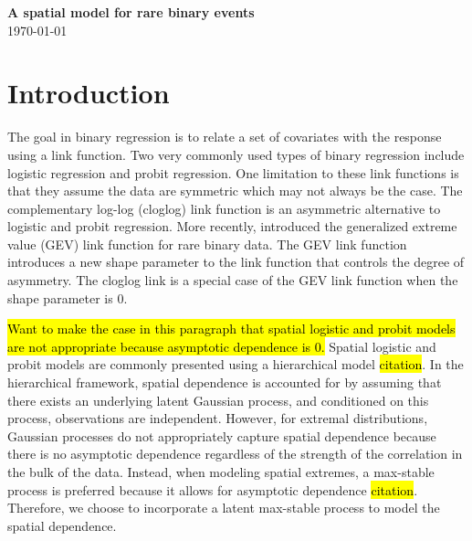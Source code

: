 \documentclass[11pt]{article}
\begin{document}
\linenumbers

\begin{center}
{\Large {\bf A spatial model for rare binary events}}\\
\today
\end{center}

\section{Introduction}\label{s:intro}
The goal in binary regression is to relate a set of covariates with the response using a link function.
Two very commonly used types of binary regression include logistic regression
and probit regression.
One limitation to these link functions is that they assume the data are symmetric which may not always be the case.
The complementary log-log (cloglog) link function is an asymmetric alternative to logistic and probit regression.
More recently, \citet{Wang2010} introduced the generalized extreme value (GEV) link function for rare binary data.
The GEV link function introduces a new shape parameter to the link function that controls the degree of asymmetry.
The cloglog link is a special case of the GEV link function when the shape parameter is 0.


\hl{Want to make the case in this paragraph that spatial logistic and probit models are not appropriate because asymptotic dependence is 0.}
Spatial logistic and probit models are commonly presented using a hierarchical model \hl{citation}.
In the hierarchical framework, spatial dependence is accounted for by assuming that there exists an underlying latent Gaussian process, and conditioned on this process, observations are independent.
However, for extremal distributions, Gaussian processes do not appropriately capture spatial dependence because there is no asymptotic dependence regardless of the strength of the correlation in the bulk of the data.
Instead, when modeling spatial extremes, a max-stable process is preferred because it allows for asymptotic dependence \hl{citation}.
Therefore, we choose to incorporate a latent max-stable process to model the spatial dependence.
\end{document}
